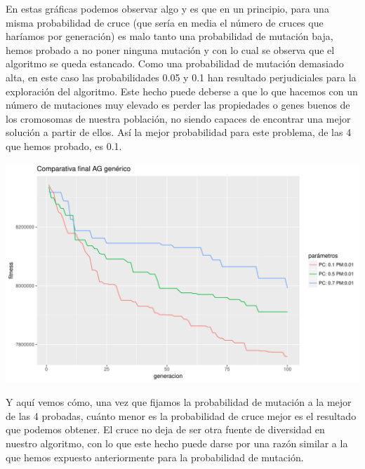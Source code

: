 \documentclass[10pt,a4paper]{article}
\begin{document}
En estas gráficas podemos observar algo y es que en un principio, para una misma probabilidad de cruce (que sería en media el número de cruces que haríamos por generación) es malo tanto una probabilidad de mutación baja, hemos probado a no poner ninguna mutación y con lo cual se observa que el algoritmo se queda estancado. Como una probabilidad de mutación demasiado alta, en este caso las probabilidades 0.05 y 0.1 han resultado perjudiciales para la exploración del algoritmo. Este hecho puede deberse a que lo que hacemos con un número de mutaciones muy elevado es perder las propiedades o genes buenos de los cromosomas de nuestra población, no siendo capaces de encontrar una mejor solución a partir de ellos. Así la mejor probabilidad para este problema, de las 4 que hemos probado, es 0.1.

\includegraphics[width = \textwidth]{img/graphics/GAgenericFinal.pdf}

Y aquí vemos cómo, una vez que fijamos la probabilidad de mutación a la mejor de las 4 probadas, cuánto menor es la probabilidad de cruce mejor es el resultado que podemos obtener. El cruce no deja de ser otra fuente de diversidad en nuestro algoritmo, con lo que este hecho puede darse por una razón similar a la que hemos expuesto anteriormente para la probabilidad de mutación.
\end{document}
